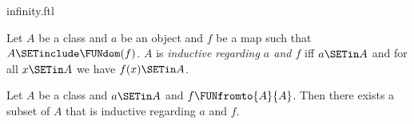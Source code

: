 \documentclass{stex}
\begin{document}
\begin{smodule}{infinity.ftl}

\begin{definition}[forthel,id=FOUNDATIONS_10_298374925738210]
  Let $A$ be a class and $a$ be an object and $f$ be a map such that $A \SETinclude \FUNdom(f)$.
  $A$ is \emph{inductive regarding $a$ and $f$} iff $a \SETin A$ and for all $x \SETin A$ we have $f(x) \SETin A$.
\end{definition}

\begin{axiom}[forthel,title=Infinity Axiom,id=FOUNDATIONS_10_367388832825344]
  Let $A$ be a class and $a \SETin A$ and $f \FUNfromto{A}{A}$.
  Then there exists a subset of $A$ that is inductive regarding $a$ and $f$.
\end{axiom}
\end{smodule}
\end{document}
